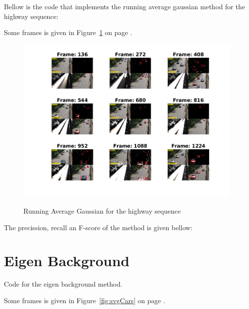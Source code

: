 \documentclass[a4paper,12pt]{article}
\begin{document}
Bellow is the code that implements the running average gaussian method for the highway sequence:
\vspace{10pt}

\vspace{30pt}

Some frames is given in Figure~\ref{fig:faverageh} on page \pageref{fig:faverageh}.

\begin{figure}[Ht]
\centering
\includegraphics{../Videos/highway_avg_gauss.png}
\label{fig:faverageh}
\caption{Running Average Gaussian for the highway sequence}
\end{figure} 


\vspace{10pt}

The precission, recall an F-score of the method is given bellow:


\section{Eigen Background}
Code for the eigen background method.

\vspace{10pt}

\vspace{30pt}

Some frames is given in Figure~\ref{fig:svgCars} on page \pageref{fig:svgCars}.
\end{document}
